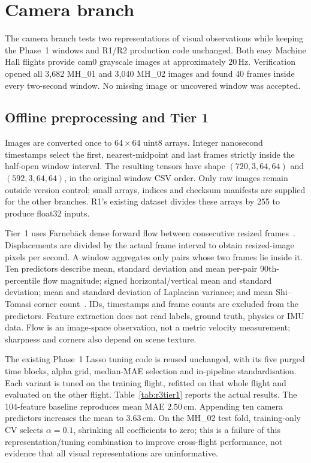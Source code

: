 \section{Camera branch}
The camera branch tests two representations of visual observations while
keeping the Phase~1 windows and R1/R2 production code unchanged. Both easy
Machine Hall flights provide cam0 grayscale images at approximately
$20\,\mathrm{Hz}$. Verification opened all 3,682 MH\_01 and 3,040 MH\_02
images and found 40 frames inside every two-second window. No missing image
or uncovered window was accepted.

\subsection{Offline preprocessing and Tier 1}
Images are converted once to $64\times64$ uint8 arrays. Integer nanosecond
timestamps select the first, nearest-midpoint and last frames strictly
inside the half-open window interval. The resulting tensors have shape
$(720,3,64,64)$ and $(592,3,64,64)$, in the original window CSV order.
Only raw images remain outside version control; small arrays, indices and
checksum manifests are supplied for the other branches. R1's existing
dataset divides these arrays by 255 to produce float32 inputs.

Tier~1 uses Farneb\"ack dense forward flow between consecutive resized
frames~\cite{r3farneback2003}. Displacements are divided by the actual frame
interval to obtain resized-image pixels per second. A window aggregates
only pairs whose two frames lie inside it. Ten predictors describe mean,
standard deviation and mean per-pair 90th-percentile flow magnitude; signed
horizontal/vertical mean and standard deviation; mean and standard
deviation of Laplacian variance; and mean Shi--Tomasi corner
count~\cite{r3shi1994}. IDs, timestamps and frame counts are excluded from
the predictors. Feature extraction does not read labels, ground truth,
physics or IMU data. Flow is an image-space observation, not a metric
velocity measurement; sharpness and corners also depend on scene texture.

The existing Phase~1 Lasso tuning code is reused unchanged, with its
five purged time blocks, alpha grid, median-MAE selection and in-pipeline
standardisation. Each variant is tuned on the training flight, refitted on
that whole flight and evaluated on the other flight. Table~\ref{tab:r3tier1}
reports the actual results. The 104-feature baseline reproduces mean MAE
$2.50\,\mathrm{cm}$. Appending ten camera predictors increases the mean to
$3.63\,\mathrm{cm}$. On the MH\_02 test fold, training-only CV selects
$\alpha=0.1$, shrinking all coefficients to zero; this is a failure of this
representation/tuning combination to improve cross-flight performance, not
evidence that all visual representations are uninformative.

